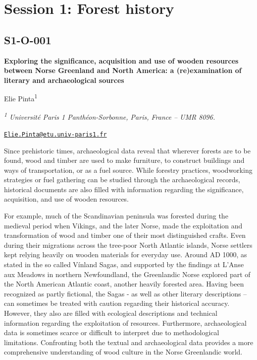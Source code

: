 \documentclass[
]{book}
\begin{document}
\hypertarget{session-1-forest-history}{%
\chapter*{Session 1: Forest history}\label{session-1-forest-history}}

\hypertarget{s1-o-001}{%
\section*{S1-O-001}\label{s1-o-001}}

\textbf{Exploring the significance, acquisition and use of wooden resources between Norse Greenland and North America: a (re)examination of literary and archaeological sources}

Elie Pinta\textsuperscript{1}

\emph{\textsuperscript{1} Université Paris 1 Panthéon-Sorbonne, Paris, France -- UMR 8096.}

\href{mailto:Elie.Pinta@etu.univ-paris1.fr}{\nolinkurl{Elie.Pinta@etu.univ-paris1.fr}}

Since prehistoric times, archaeological data reveal that wherever forests are to be found, wood and timber are used to make furniture, to construct buildings and ways of transportation, or as a fuel source. While forestry practices, woodworking strategies or fuel gathering can be studied through the archaeological records, historical documents are also filled with information regarding the significance, acquisition, and use of wooden resources.

For example, much of the Scandinavian peninsula was forested during the medieval period when Vikings, and the later Norse, made the exploitation and transformation of wood and timber one of their most distinguished crafts. Even during their migrations across the tree-poor North Atlantic islands, Norse settlers kept relying heavily on wooden materials for everyday use. Around AD 1000, as stated in the so called Vínland Sagas, and supported by the findings at L'Anse aux Meadows in northern Newfoundland, the Greenlandic Norse explored part of the North American Atlantic coast, another heavily forested area. Having been recognized as partly fictional, the Sagas - as well as other literary descriptions -- can sometimes be treated with caution regarding their historical accuracy. However, they also are filled with ecological descriptions and technical information regarding the exploitation of resources. Furthermore, archaeological data is sometimes scarce or difficult to interpret due to methodological limitations. Confronting both the textual and archaeological data provides a more comprehensive understanding of wood culture in the Norse Greenlandic world.
\end{document}
